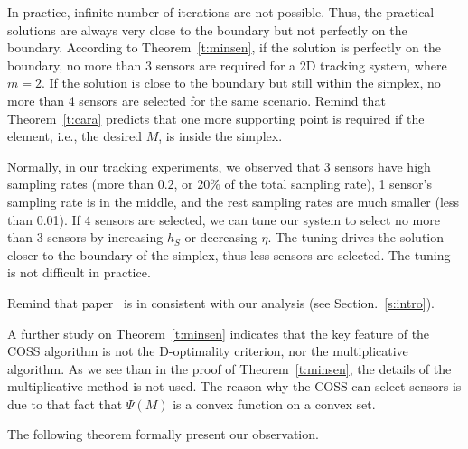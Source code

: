 \begin{remark}
In practice, infinite number of iterations are not possible. Thus,  the practical solutions are always very close to the boundary but not perfectly on the boundary.
    According to Theorem~\ref{t:minsen}, if the solution is perfectly on the boundary, no more than 3 sensors are required for a 2D tracking system, where $m=2$. If the solution is close to the boundary but still within the simplex, no more than 4 sensors are selected for the same scenario. Remind that Theorem~\ref{t:cara} predicts that one more supporting point is required if the element, i.e., the desired $M$, is inside the simplex.

Normally, in our tracking experiments, we observed that 3 sensors have high sampling rates (more than 0.2, or 20\% of the total sampling rate), 1 sensor's sampling rate is in the middle, and the rest sampling rates are much smaller (less than 0.01).
  If 4 sensors are selected, we can tune our system to select no more than 3 sensors by increasing $h_S$ or decreasing $\eta$. The tuning drives the solution closer to the boundary of the simplex, thus less sensors are selected. The tuning is not difficult in practice.

    Remind that paper~\cite{isler06tase} is in consistent with our analysis (see Section.~\ref{s:intro}).


A further study on Theorem~\ref{t:minsen} indicates that the key feature of the COSS algorithm is not the D-optimality criterion, nor the multiplicative algorithm.
As we see than in the proof of Theorem~\ref{t:minsen}, the details of the multiplicative method is not used. The reason why the COSS can select sensors is due to that fact that $\Psi(M)$ is a convex function on a convex set.
\end{remark}

The following theorem formally present our observation.

